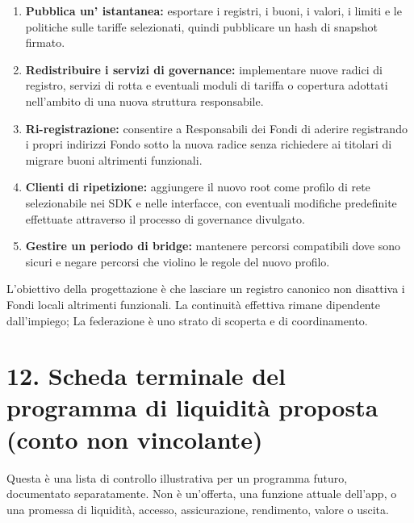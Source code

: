 \documentclass[11pt]{article}
\begin{document}
\begin{enumerate}[leftmargin=*]
\item \textbf{Pubblica un' istantanea:} esportare i registri, i buoni, i valori, i limiti e le politiche sulle tariffe selezionati, quindi pubblicare un hash di snapshot firmato.
\item \textbf{Redistribuire i servizi di governance:} implementare nuove radici di registro, servizi di rotta e eventuali moduli di tariffa o copertura adottati nell'ambito di una nuova struttura responsabile.
\item \textbf{Ri-registrazione:} consentire a Responsabili dei Fondi di aderire registrando i propri indirizzi Fondo sotto la nuova radice senza richiedere ai titolari di migrare buoni altrimenti funzionali.
\item \textbf{Clienti di ripetizione:} aggiungere il nuovo root come profilo di rete selezionabile nei SDK e nelle interfacce, con eventuali modifiche predefinite effettuate attraverso il processo di governance divulgato.
\item \textbf{Gestire un periodo di bridge:} mantenere percorsi compatibili dove sono sicuri e negare percorsi che violino le regole del nuovo profilo.
\end{enumerate}
L'obiettivo della progettazione è che lasciare un registro canonico non disattiva i Fondi locali altrimenti funzionali. La continuità effettiva rimane dipendente dall'impiego; La federazione è uno strato di scoperta e di coordinamento.


\section*{12. Scheda terminale del programma di liquidità proposta (conto non vincolante)}

Questa è una lista di controllo illustrativa per un programma futuro, documentato separatamente. Non è un'offerta, una funzione attuale dell'app, o una promessa di liquidità, accesso, assicurazione, rendimento, valore o uscita.
\end{document}
